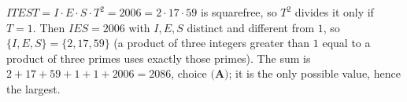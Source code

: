 $ITEST=I\cdot E\cdot S\cdot T^2=2006=2\cdot17\cdot59$ is squarefree, so $T^2$ divides it only if $T=1$. Then $IES=2006$ with $I,E,S$ distinct and different from $1$, so $\{I,E,S\}=\{2,17,59\}$ (a product of three integers greater than $1$ equal to a product of three primes uses exactly those primes). The sum is $2+17+59+1+1+2006=\boxed{2086}$, choice $\textbf{(A)}$; it is the only possible value, hence the largest.
